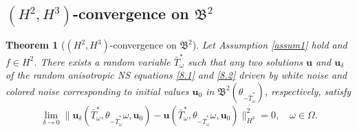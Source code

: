 \documentclass{elsarticle}
\newtheorem{theorem}{Theorem}[section]
\theoremstyle{definition}
\numberwithin{equation}{section}
\begin{document}
\subsection{$(H^2, H^3)$-convergence on $\mathfrak B^2$}
\begin{theorem}[$(H^2, H^3)$-convergence on $\mathfrak B^2$]\label{lemma8.4}  Let Assumption \ref{assum1} hold and $f\in H^2$. There  exists a  random variable $\bar{T}_\omega^*$  such that    any
 two solutions $\textbf{u}$ and $\textbf{u}_\delta$ of the random anisotropic  NS equations \eqref{8.1} and \eqref{8.2} driven by  white noise  and colored noise corresponding to initial values  $\textbf{u}_{0}$  in $\mathfrak{B}^2(\theta_{-\bar{T}_\omega^*})$, respectively,   satisfy
\begin{align*}
 \lim\limits_{\delta\rightarrow0}\|\textbf{u}_\delta(\bar{T}_\omega^*,\theta_{-\bar{T}_\omega^*}\omega,\textbf{u}_{0})
 -\textbf{u}(\bar{T}_\omega^*,\theta_{-\bar{T}_\omega^*}\omega,\textbf{u}_{0}) \big \|^2_{H^3}=0, \quad \omega\in \Omega.
\end{align*}
\end{theorem}
\end{document}
